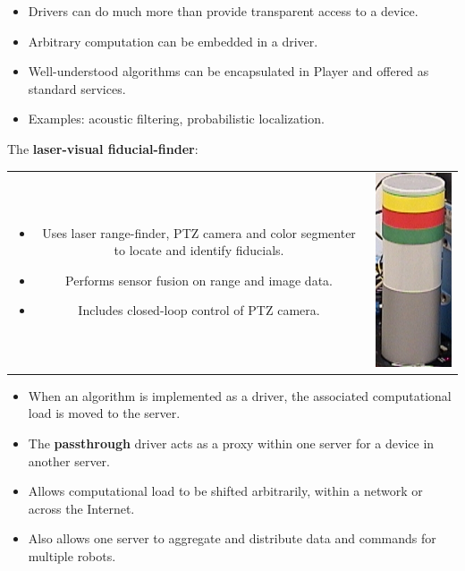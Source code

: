 \documentclass[30pt,landscape,magscalefonts]{foils}
\newcommand{\foilheadc}[1]{\foilhead{\Large \textcolor{myred}{#1}}\vspace*{-2em}}
\newenvironment{xitemize}{\begin{itemize} \itemsep 1pt}{\end{itemize}}
\def\movieroot{file:///mnt/win/users/gerkey/videos}
\begin{document}
\foilheadc{Sophisticated drivers}
\begin{itemize}
\item Drivers can do much more than provide transparent access to a device.
\item Arbitrary computation can be embedded in a driver.
\item Well-understood algorithms can be encapsulated in Player and
offered as standard services.
\item Examples: acoustic filtering, probabilistic localization.
\end{itemize}

\foilheadc{Sophisticated drivers (cont'd)}
The {\bf laser-visual fiducial-finder}:

\begin{tabular}{cc}
\parbox{.7\textwidth}{
\begin{itemize}
\item Uses laser range-finder, PTZ camera and color segmenter to locate and 
identify fiducials.
\item Performs sensor fusion on range and image data.
\item Includes closed-loop control of PTZ camera.
\end{itemize}}
&
\parbox{.3\textwidth}{\href{\movieroot/lvb.avi}{\includegraphics[width=.21\textwidth]{laservisualbeacon2.jpg}}}
\end{tabular}

\foilheadc{Shifting the computation}
\begin{xitemize}
\item When an algorithm is implemented as a driver, the associated
computational load is moved to the server.
\item The {\bf passthrough} driver acts as a proxy within one server
for a device in another server.
\item Allows computational load to be shifted arbitrarily, within a
network or across the Internet.
\item Also allows one server to aggregate and distribute data and
commands for multiple robots.
\end{xitemize}
\end{document}
